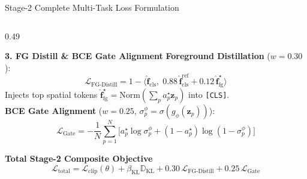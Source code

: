\documentclass[aspectratio=169,10pt]{beamer}
\begin{document}
\begin{frame}{Stage-2 Complete Multi-Task Loss Formulation}
\begin{columns}[t]
    \begin{column}{0.49\textwidth}
        \begin{block}{\textbf{3. FG Distill \& BCE Gate Alignment}}
            \scriptsize
            \textbf{Foreground Distillation} ($w=0.30$):
            \[
                \mathcal{L}_{\text{FG-Distill}} = 1 - \big\langle \hat{\mathbf{f}}_{\text{cls}}, \; 0.88\,\hat{\mathbf{f}}_{\text{cls}}^{\text{ref}} + 0.12\,\hat{\mathbf{f}}_{\text{fg}}^{\star}\big\rangle
            \]
            \vspace{-0.5em}
            Injects top spatial tokens $\hat{\mathbf{f}}_{\text{fg}}^\star = \text{Norm}(\sum_p a_p^\star \mathbf{z}_p)$ into \texttt{[CLS]}.\\[2pt]
            \textbf{BCE Gate Alignment} ($w=0.25$, $\sigma_p^\phi = \sigma(g_\phi(\mathbf{z}_p))$):
            \[
                \mathcal{L}_{\text{Gate}} = -\frac{1}{N}\sum_{p=1}^N \Big[a_p^\star \log \sigma_p^\phi + (1 - a_p^\star)\log(1 - \sigma_p^\phi)\Big]
            \]
        \end{block}

        \vspace{-0.3em}
        \begin{alertblock}{\textbf{Total Stage-2 Composite Objective}}
            \scriptsize
            \vspace{-0.4em}
            \[
                \mathcal{L}_{\text{total}} = \mathcal{L}_{\text{clip}}(\theta) + \beta_{\text{KL}}\mathbb{D}_{\text{KL}} + 0.30\,\mathcal{L}_{\text{FG-Distill}} + 0.25\,\mathcal{L}_{\text{Gate}}
            \]
        \end{alertblock}
    \end{column}
\end{columns}
\end{frame}
\end{document}
